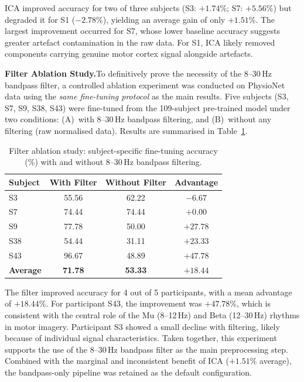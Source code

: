 \documentclass[12pt, a4paper]{article}
\begin{document}
ICA improved accuracy for two of three subjects (S3: $+1.74\%$; S7: $+5.56\%$) but degraded it for S1 ($-2.78\%$), yielding an average gain of only $+1.51\%$. The largest improvement occurred for S7, whose lower baseline accuracy suggests greater artefact contamination in the raw data. For S1, ICA likely removed components carrying genuine motor cortex signal alongside artefacts.

\textbf{Filter Ablation Study.}\quad To definitively prove the necessity of the 8--30\,Hz bandpass filter, a controlled ablation experiment was conducted on PhysioNet data using the \emph{same fine-tuning protocol} as the main results. Five subjects (S3, S7, S9, S38, S43) were fine-tuned from the 109-subject pre-trained model under two conditions: (A)~with 8--30\,Hz bandpass filtering, and (B)~without any filtering (raw normalised data). Results are summarised in Table~\ref{tab:filter_ablation}.

\begin{table}[h]
\centering
\caption{Filter ablation study: subject-specific fine-tuning accuracy (\%) with and without 8--30\,Hz bandpass filtering.}
\label{tab:filter_ablation}
\begin{tabular}{lccc}
\toprule
Subject & With Filter & Without Filter & Advantage \\
\midrule
S3  & 55.56 & 62.22 & $-6.67$ \\
S7  & 74.44 & 74.44 & $+0.00$ \\
S9  & 77.78 & 50.00 & $+27.78$ \\
S38 & 54.44 & 31.11 & $+23.33$ \\
S43 & 96.67 & 48.89 & $+47.78$ \\
\midrule
\textbf{Average} & \textbf{71.78} & \textbf{53.33} & $\mathbf{+18.44}$ \\
\bottomrule
\end{tabular}
\end{table}

The filter improved accuracy for 4 out of 5 participants, with a mean advantage of $+18.44\%$. For participant S43, the improvement was $+47.78\%$, which is consistent with the central role of the Mu (8--12\,Hz) and Beta (12--30\,Hz) rhythms in motor imagery. Participant S3 showed a small decline with filtering, likely because of individual signal characteristics. Taken together, this experiment supports the use of the 8--30\,Hz bandpass filter as the main preprocessing step. Combined with the marginal and inconsistent benefit of ICA ($+1.51\%$ average), the bandpass-only pipeline was retained as the default configuration.
\end{document}
